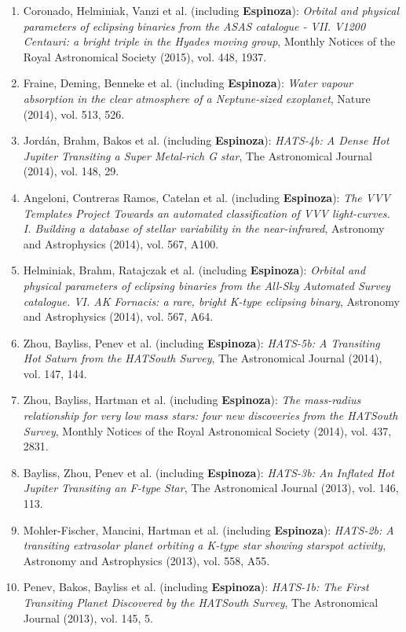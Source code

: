 \documentclass[12pt, a4paper]{article} %
\begin{document}
\begin{flushleft}
\begin{enumerate}
\item Coronado, Helminiak, Vanzi et al. (including \textbf{Espinoza}): \textit{Orbital and physical parameters of eclipsing binaries from the ASAS catalogue - VII. V1200 Centauri: a bright triple in the Hyades moving group}, Monthly Notices of the Royal Astronomical Society (2015), vol. 448, 1937.
\item Fraine, Deming, Benneke et al. (including \textbf{Espinoza}): \textit{Water vapour absorption in the clear atmosphere of a Neptune-sized exoplanet}, Nature (2014), vol. 513, 526.
\item Jord\'an, Brahm, Bakos et al. (including \textbf{Espinoza}): \textit{HATS-4b: A Dense Hot Jupiter Transiting a Super Metal-rich G star}, The Astronomical Journal (2014), vol. 148, 29.
\item Angeloni, Contreras Ramos, Catelan et al. (including \textbf{Espinoza}): \textit{The VVV Templates Project Towards an automated classification of VVV light-curves. I. Building a database of stellar variability in the near-infrared}, Astronomy and Astrophysics (2014), vol. 567, A100.
\item Helminiak, Brahm, Ratajczak et al. (including \textbf{Espinoza}): \textit{Orbital and physical parameters of eclipsing binaries from the All-Sky Automated Survey catalogue. VI. AK Fornacis: a rare, bright K-type eclipsing binary}, Astronomy and Astrophysics (2014), vol. 567, A64.
\item Zhou, Bayliss, Penev et al. (including \textbf{Espinoza}): \textit{HATS-5b: A Transiting Hot Saturn from the HATSouth Survey}, The Astronomical Journal (2014), vol. 147, 144.
\item Zhou, Bayliss, Hartman et al. (including \textbf{Espinoza}): \textit{The mass-radius relationship for very low mass stars: four new discoveries from the HATSouth Survey}, Monthly Notices of the Royal Astronomical Society (2014), vol. 437, 2831.
\item Bayliss, Zhou, Penev et al. (including \textbf{Espinoza}): \textit{HATS-3b: An Inflated Hot Jupiter Transiting an F-type Star}, The Astronomical Journal (2013), vol. 146, 113.
\item Mohler-Fischer, Mancini, Hartman et al. (including \textbf{Espinoza}): \textit{HATS-2b: A transiting extrasolar planet orbiting a K-type star showing starspot activity}, Astronomy and Astrophysics (2013), vol. 558, A55.
\item Penev, Bakos, Bayliss et al. (including \textbf{Espinoza}): \textit{HATS-1b: The First Transiting Planet Discovered by the HATSouth Survey}, The Astronomical Journal (2013), vol. 145, 5.
\end{enumerate}
\end{flushleft}
\end{document}
